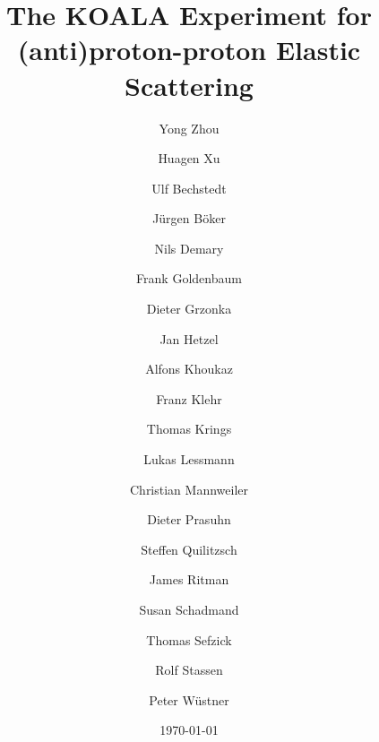 \documentclass[number,5p]{elsarticle}
\begin{document}
\begin{frontmatter}	
  \title{The KOALA Experiment for (anti)proton-proton Elastic Scattering}
  \date{\today}

  \author[ikp]{Yong Zhou}
  \author[ikp]{Huagen Xu}

  \author[ikp]{Ulf Bechstedt}
  \author[ikp]{Jürgen Böker}
  \author[ikp]{Nils Demary}
  \author[ikp]{Frank Goldenbaum}
  \author[ikp]{Dieter Grzonka}
  \author[ikp]{Jan Hetzel}
  \author[muenster]{Alfons Khoukaz}
  \author[ikp]{Franz Klehr}
  \author[ikp]{Thomas Krings}
  \author[muenster]{Lukas Lessmann}
  \author[muenster]{Christian Mannweiler}
  \author[ikp]{Dieter Prasuhn}
  \author[ikp]{Steffen Quilitzsch}
  \author[gsi,bochum,ikp]{James Ritman}
  \author[ikp]{Susan Schadmand}
  \author[ikp]{Thomas Sefzick}
  \author[ikp]{Rolf Stassen}
  \author[zea]{Peter Wüstner}


  \address[ikp]{Institut für Kernphysik, Forschungszentrum Jülich, Jülich, 52425, Germany}
  \address[muenster]{Institut für Kernphysik, Universität Münster, Münster, 48149, Germany}
  \address[bochum]{Ruhr-Universität Bochum, Bochum, 44780, Germany}
  \address[gsi]{GSI Helmholtzzentrum für Schwerionenforschung GmbH, Darmstadt, 64291, Germany}
  \address[zea]{Zentralinstitut für Engineering, Elektronik und Analytik, Forschungszentrum Jülich, Jülich, 52425, Germany}


  \begin{abstract}


\end{abstract}
\end{frontmatter}
\end{document}
